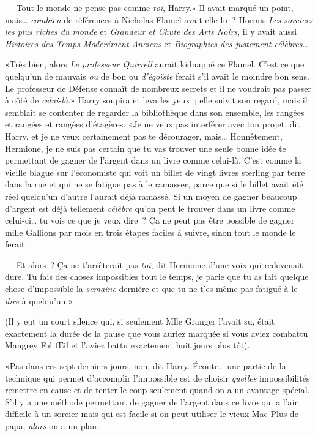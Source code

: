 --- Tout le monde ne pense pas comme \emph{toi}, Harry.» Il avait marqué un point, mais… \emph{combien} de références à Nicholas Flamel avait-elle lu~? Hormis \emph{Les sorciers les plus riches du monde} et \emph{Grandeur et Chute des Arts Noirs}, il y avait aussi \emph{Histoires des Temps Modérément Anciens} et \emph{Biographies des justement célèbres}…

«Très bien, alors \emph{Le professeur Quirrell} aurait kidnappé ce Flamel. C'est ce que quelqu'un de mauvais \emph{ou} de bon ou \emph{d'égoïste} ferait s'il avait le moindre bon sens. Le professeur de Défense connaît de nombreux secrets et il ne voudrait pas passer à côté de \emph{celui-là}.» Harry soupira et leva les yeux~; elle suivit son regard, mais il semblait se contenter de regarder la bibliothèque dans son ensemble, les rangées et rangées et rangées d'étagères. «Je ne veux pas interférer avec ton projet, dit Harry, et je ne veux certainement pas te décourager, mais… Honnêtement, Hermione, je ne suis pas certain que tu vas trouver une seule bonne idée te permettant de gagner de l'argent dans un livre comme celui-là. C'est comme la vieille blague sur l'économiste qui voit un billet de vingt livres sterling par terre dans la rue et qui ne se fatigue pas à le ramasser, parce que si le billet avait été réel quelqu'un d'autre l'aurait déjà ramassé. Si un moyen de gagner beaucoup d'argent est déjà tellement \emph{célèbre} qu'on peut le trouver dans un livre comme celui-ci… tu vois ce que je veux dire~? Ça ne peut pas être possible de gagner mille Gallions par mois en trois étapes faciles à suivre, sinon tout le monde le ferait.

--- Et alors~? Ça ne t'arrêterait pas \emph{toi}, dit Hermione d'une voix qui redevenait dure. Tu fais des choses impossibles tout le temps, je parie que tu as fait quelque chose d'impossible la \emph{semaine} dernière et que tu ne t'es même pas fatigué à le \emph{dire} à quelqu'un.»

(Il y eut un court silence qui, si seulement Mlle Granger l'avait su, était exactement la durée de la pause que vous auriez marquée si vous aviez combattu Maugrey Fol Œil et l'aviez battu exactement huit jours plus tôt).

«Pas dans ces sept derniers jours, non, dit Harry. Écoute… une partie de la technique qui permet d'accomplir l'impossible est de choisir \emph{quelles} impossibilités remettre en cause et de tenter le coup seulement quand on a un avantage spécial. S'il y a une méthode permettant de gagner de l'argent dans ce livre qui a l'air difficile à un sorcier mais qui est facile si on peut utiliser le vieux Mac Plus de papa, \emph{alors} on a un plan.

